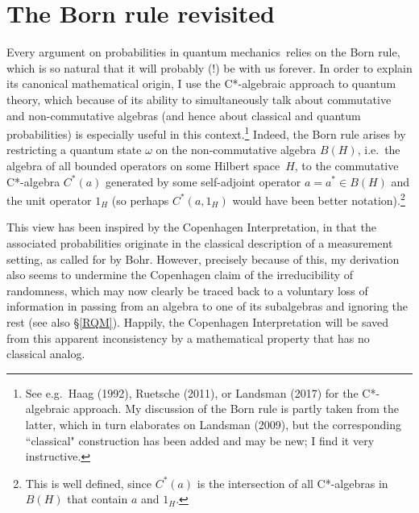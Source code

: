 \documentclass[12pt]{article}
\numberwithin{equation}{section}
\newcommand{\qm}{quantum mechanics}
\newcommand{\Hs}{Hilbert space} \newcommand{\Bs}{Banach space}
\newcommand{\om}{\omega} \newcommand{\Om}{\Omega}
\begin{document}
 \section{The Born rule revisited}\label{BR}
 Every argument on probabilities in \qm\ relies on the Born rule, which is so natural that it will probably (!) be with us forever. In order to explain its canonical mathematical origin, I use the C*-algebraic approach to quantum theory, which because of its ability to simultaneously talk about commutative and non-commutative algebras (and hence about classical and quantum probabilities) is especially useful in this context.\footnote{See e.g.\ Haag (1992), Ruetsche (2011), or Landsman (2017) for the  C*-algebraic approach. My discussion of the Born rule is partly taken from the latter, which in turn elaborates on Landsman (2009), but the corresponding ``classical" construction has been added and may be new; I find it very instructive.} Indeed, the Born rule arises  by restricting a quantum state $\om$ on the non-commutative algebra $B(H)$, i.e.\ the algebra of all bounded operators on some \Hs\ $H$,  to the commutative  C*-algebra $C^*(a)$ generated by some self-adjoint operator $a=a^*\in B(H)$ and the unit operator $1_H$ (so perhaps $C^*(a,1_H)$ would have been better notation).\footnote{This is well defined, since $C^*(a)$ is  the intersection of all C*-algebras in $B(H)$ that contain $a$ and $1_H$.}  
 
 This view has been inspired by  the Copenhagen Interpretation, in that the associated probabilities originate in the classical description of a measurement setting, as called for by Bohr. However, 
precisely because of this, my derivation also seems to undermine the Copenhagen claim of the irreducibility of randomness, which may now clearly be traced back to a voluntary loss of information in passing from an algebra to one of its subalgebras and ignoring the rest (see also \S\ref{RQM}). Happily, the Copenhagen Interpretation will be saved from this apparent inconsistency by a mathematical property that has no classical analog.
\end{document}
